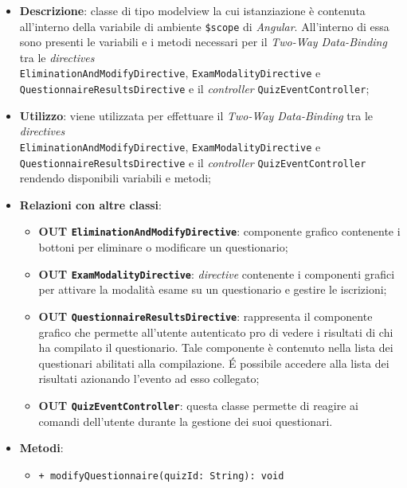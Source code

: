 \begin{itemize}
	\item \textbf{Descrizione}: classe di tipo modelview la cui istanziazione è contenuta all'interno della variabile di ambiente \texttt{\$scope} di \textit{Angular}. All'interno di essa sono presenti le variabili e i metodi necessari per il \textit{Two-Way Data-Binding} tra le \textit{directives}\\ \texttt{EliminationAndModifyDirective}, \texttt{ExamModalityDirective} e \\\texttt{QuestionnaireResultsDirective} e il \textit{controller} \texttt{QuizEventController};
	\item \textbf{Utilizzo}: viene utilizzata per effettuare il \textit{Two-Way Data-Binding} tra le \textit{directives}\\ \texttt{EliminationAndModifyDirective}, \texttt{ExamModalityDirective} e \\\texttt{QuestionnaireResultsDirective} e il \textit{controller} \texttt{QuizEventController} rendendo disponibili variabili e metodi;
	\item \textbf{Relazioni con altre classi}: 
	\begin{itemize}
		\item \textbf{OUT \texttt{EliminationAndModifyDirective}}: componente grafico contenente i bottoni per eliminare o modificare un questionario;
		\item \textbf{OUT \texttt{ExamModalityDirective}}: \textit{directive} contenente i componenti grafici per attivare la modalità esame su un questionario e gestire le iscrizioni; 
		\item \textbf{OUT \texttt{QuestionnaireResultsDirective}}: rappresenta il componente grafico che permette all'utente autenticato pro di vedere i risultati di chi ha compilato il questionario. Tale componente è contenuto nella lista dei questionari abilitati alla compilazione. \'E possibile accedere alla lista dei risultati azionando l'evento ad esso collegato; 
		\item \textbf{OUT \texttt{QuizEventController}}: questa classe permette di reagire ai comandi dell'utente durante la gestione dei suoi questionari.
	\end{itemize}
	\item \textbf{Metodi}: 
	\begin{itemize}
		\item \texttt{+ modifyQuestionnaire(quizId: String): void} \\

\end{itemize}
\end{itemize}
